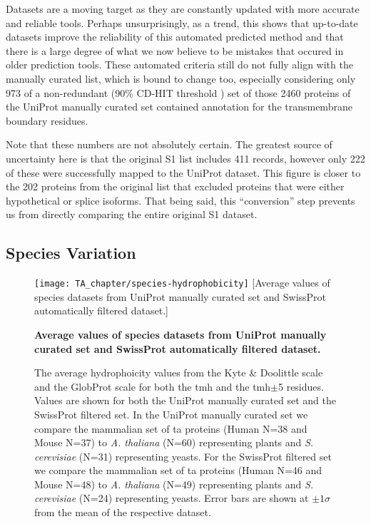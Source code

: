 Datasets are a moving target as they are constantly updated with more accurate and reliable tools.
Perhaps unsurprisingly, as a trend, this shows that up-to-date datasets improve the reliability of this automated predicted method and that there is a large degree of what we now believe to be mistakes that occured in older prediction tools.
These automated criteria still do not fully align with the manually curated list, which is bound to change too, especially considering only 973 of a non-redundant (90\% CD-HIT threshold \cite{Huang2010, Wu2011}) set of those 2460 proteins of the UniProt manually curated set contained annotation for the transmembrane boundary residues.

Note that these numbers are not absolutely certain.
The greatest source of uncertainty here is that the original S1 list includes 411 records, however only 222 of these were successfully mapped to the UniProt dataset.
This figure is closer to the 202 proteins from the original list that excluded proteins that were either hypothetical or splice isoforms.
That being said, this ``conversion'' step prevents us from directly comparing the entire original S1 dataset.

\subsection{Species Variation}
\begin{figure}[!ht]
\centering
\texttt{[image: TA\_chapter/species-hydrophobicity]}
[Average values of species datasets from UniProt manually curated set and SwissProt automatically filtered dataset.]
{\textbf{Average values of species datasets from UniProt manually curated set and SwissProt automatically filtered dataset.}

The average hydrophoicity values from the Kyte \& Doolittle scale ~\cite{Kyte1982} and the GlobProt scale \cite{Linding2003} for both the \gls{tmh} and the \gls{tmh}$\pm$5 residues. Values are shown for both the UniProt manually curated set and the SwissProt filtered set. In the UniProt manually curated set we compare the mammalian set of \gls{ta} proteins (Human N=38 and Mouse N=37) to \textit{A. thaliana} (N=60) representing plants  and  \textit{S. cerevisiae} (N=31) representing yeasts. For the SwissProt filtered set we compare the mammalian set of \gls{ta} proteins (Human N=46 and Mouse N=48) to \textit{A. thaliana} (N=49) representing plants  and  \textit{S. cerevisiae} (N=24) representing yeasts.
Error bars are shown at $\pm 1 \sigma$ from the mean of the respective dataset.
}

\label{fig:average_species_hydrophobicity_ta}
\end{figure}

